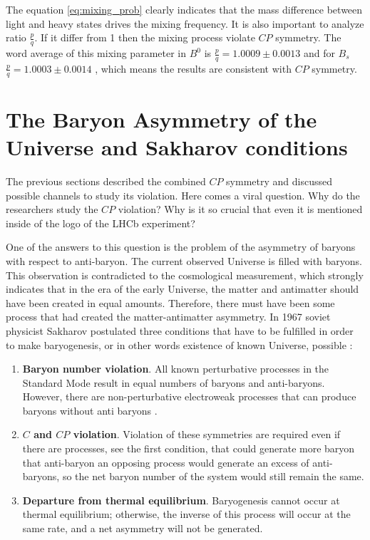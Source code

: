 The equation \ref{eq:mixing_prob} clearly indicates that the mass difference between light and heavy states drives the mixing frequency. It is also important to analyze ratio $\frac{p}{q}$. If it differ from 1 then the mixing process violate $CP$ symmetry. The word average of this mixing parameter in $B^{0}$ is  $\frac{p}{q} = 1.0009 \pm 0.0013$ and  for $B_s$  $\frac{p}{q} = 1.0003 \pm 0.0014$ \cite{PDG}, which means the results are consistent with $CP$ symmetry. 

\section{The Baryon Asymmetry of the Universe and Sakharov conditions}

The previous sections described the combined $CP$ symmetry and discussed possible channels to study its violation. Here comes a viral question. Why do the researchers study the $CP$ violation? Why is it so crucial that even it is mentioned inside of the logo of the LHCb experiment? 

One of the answers to this question is the problem of the asymmetry of baryons with respect to anti-baryon. The current observed Universe is filled with baryons.  This observation is contradicted to the cosmological measurement, which strongly indicates that in the era of the early Universe, the matter and antimatter should have been created in equal amounts. Therefore, there must have been some process that had created the matter-antimatter asymmetry.  
In 1967 soviet physicist Sakharov postulated three conditions that have to be fulfilled in order to make baryogenesis, or in other words existence of known Universe,  possible \cite{sakharov}: 

\begin{enumerate}
    \item \textbf{Baryon number violation}.  All known perturbative processes in the Standard Mode result in equal numbers of baryons and anti-baryons. However, there are non-perturbative electroweak processes that can produce baryons without anti baryons \cite{bayron_number_violation}. 
    \item \textbf{$C$ and $CP$ violation}. Violation of these symmetries are required even if there are processes, see the first condition, that could generate more baryon that anti-baryon an opposing process would generate an excess of anti-baryons, so the net baryon number of the system would still remain the same.
    \item \textbf{Departure from thermal equilibrium}. Baryogenesis cannot occur at thermal equilibrium; otherwise, the inverse of this process will occur at the same rate, and a net asymmetry will not be generated.
\end{enumerate}

